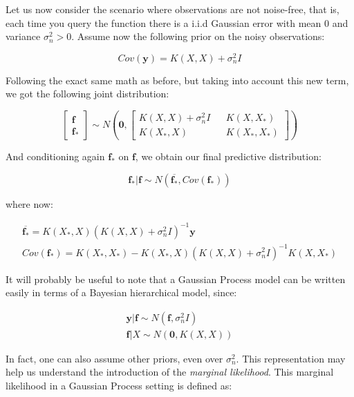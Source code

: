 \documentclass[10pt,a4paper,twoside]{book}
\begin{document}
Let us now consider the scenario where observations are not noise-free, that is, each time you query the function there is a i.i.d Gaussian error with mean $0$ and variance $\sigma_n^2 > 0$. Assume now the following prior on the noisy observations:

\begin{equation}
Cov(\boldsymbol{y}) = K(X, X) + \sigma^2_n I 
\end{equation}

Following the exact same math as before, but taking into account this new term, we got the following joint distribution:

\begin{equation}
\begin{bmatrix}
\boldsymbol{f}\\
\boldsymbol{f_*}
\end{bmatrix} \sim N\left(
\boldsymbol{0},
\begin{bmatrix}
K(X, X) + \sigma^2_n I && K(X, X_*) \\
K(X_*, X) && K(X_*, X_*)
\end{bmatrix}
\right)
\end{equation}

And conditioning again $\boldsymbol{f_{*}}$ on $\boldsymbol{f}$, we obtain our final predictive distribution:

\begin{equation}
\boldsymbol{f_*|f} \sim N(\boldsymbol{\overline{f_*}},  Cov(\boldsymbol{f_*}))
\end{equation}

where now:

\begin{align}
\boldsymbol{\overline{f_*}} = K(X_*, X)\left(K(X, X) + \sigma^2_n I   \right)^{-1}\boldsymbol{y}\\
Cov(\boldsymbol{f_*}) = K(X_*, X_*) - K(X_*, X)\left(K(X, X) + \sigma_n^2 I \right)^{-1}K(X, X_*)
\end{align}

It will probably be useful to note that a Gaussian Process model can be written easily in terms of a Bayesian hierarchical model, since:

\begin{align}
\label{hierarchical}
\boldsymbol{y}|\boldsymbol{f} \sim N(\boldsymbol{f}, \sigma^2_n I)\\
\label{hierarchical2}
\boldsymbol{f}|X \sim N(\boldsymbol{0}, K(X, X))
\end{align}

In fact, one can also assume other priors, even over $\sigma_n^2$. This representation may help us understand the introduction of the \textit{marginal likelihood}. This marginal likelihood in a Gaussian Process setting is defined as:
\end{document}
